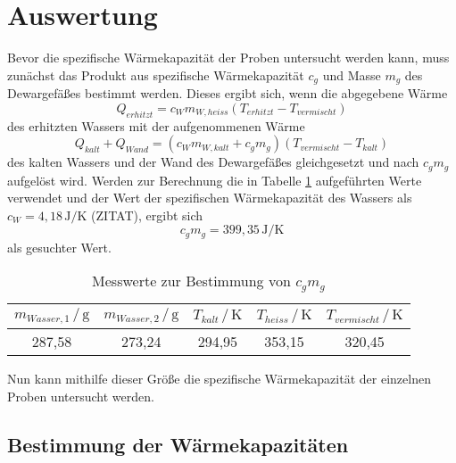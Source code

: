 \section{Auswertung}
\label{sec:Auswertung}

Bevor die spezifische Wärmekapazität der Proben untersucht werden kann, muss zunächst das Produkt 
aus spezifische Wärmekapazität $c_g$ und Masse $m_g$ des Dewargefäßes bestimmt werden. 
Dieses ergibt sich, wenn die abgegebene Wärme 
\begin{equation}
    Q_{erhitzt} = c_{W} m_{W,heiss} (T_{erhitzt}-T_{vermischt})
\end{equation}
des erhitzten Wassers mit der aufgenommenen Wärme 
\begin{equation}
    Q_{kalt} + Q_{Wand} = (c_{W}  m_{W,kalt} + c_g m_g) (T_{vermischt} - T_{kalt})
\end{equation}
des kalten Wassers und der Wand des Dewargefäßes gleichgesetzt und nach $c_g m_g$ aufgelöst wird.
Werden zur Berechnung die in Tabelle \ref{tab:1} aufgeführten Werte verwendet und der Wert 
der spezifischen Wärmekapazität des Wassers als $c_{W} = 4,18\, \si{\joule\per\kelvin} $ (ZITAT),
ergibt sich 
\begin{equation}
    c_g m_g = 399,35\, \si{\joule\per\kelvin}
\end{equation}
\noindent als gesuchter Wert.

\begin{table}[h]
\normalsize

\centering
{}
\begin{tabular}{c c c c c}
\toprule
        $m_{Wasser,1} \,/\, \si{\gram}$ &$ m_{Wasser,2} \,/\, \si{\gram}$ & $T_{kalt} \,/\, \si{\kelvin} $& $T_{heiss} \,/\, \si{\kelvin} $& $T_{vermischt} \,/\, \si{\kelvin} $\\
        \midrule
        287,58 & 273,24‬ & 294,95 & 353,15 & 320,45 \\

\bottomrule

\end{tabular}

\caption{Messwerte zur Bestimmung von $c_g m_g$}
\label{tab:1}
\end{table}
\noindent
Nun kann mithilfe dieser Größe die spezifische Wärmekapazität der einzelnen Proben untersucht werden.





\subsection{Bestimmung der Wärmekapazitäten}

